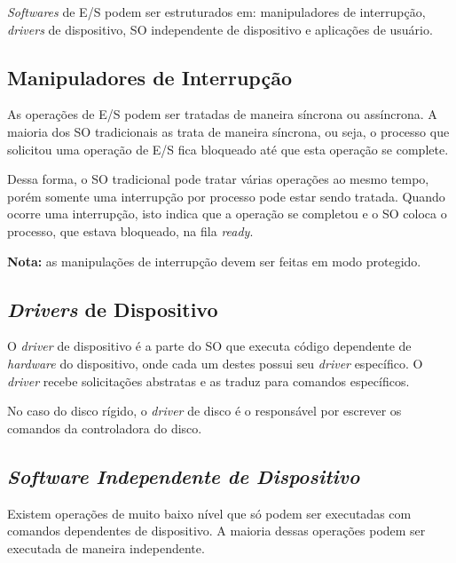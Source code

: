 \textit{Softwares} de E/S podem ser estruturados em: manipuladores de interrupção, \textit{drivers} de dispositivo, SO independente de dispositivo e aplicações de usuário.





\subsection{Manipuladores de Interrupção}
As operações de E/S podem ser tratadas de maneira síncrona ou assíncrona. A maioria dos SO tradicionais as trata de maneira síncrona, ou seja, o processo que solicitou uma operação de E/S fica bloqueado até que esta operação se complete.

Dessa forma, o SO tradicional pode tratar várias operações ao mesmo tempo, porém somente uma interrupção por processo pode estar sendo tratada. Quando ocorre uma interrupção, isto indica que a operação se completou e o SO coloca o processo, que estava bloqueado, na fila \textit{ready}.

\textbf{Nota:} as manipulações de interrupção devem ser feitas em modo protegido.




\subsection{\textit{Drivers} de Dispositivo}
O \textit{driver} de dispositivo é a parte do SO que executa código dependente de \textit{hardware} do dispositivo, onde cada um destes possui seu \textit{driver} específico. O \textit{driver} recebe solicitações abstratas e as traduz para comandos específicos.

No caso do disco rígido, o \textit{driver} de disco é o responsável por escrever os comandos da controladora do disco.




\subsection{\textit{Software Independente de Dispositivo}}
Existem operações de muito baixo nível que só podem ser executadas com comandos dependentes de dispositivo. A maioria dessas operações podem ser executada de maneira independente.


